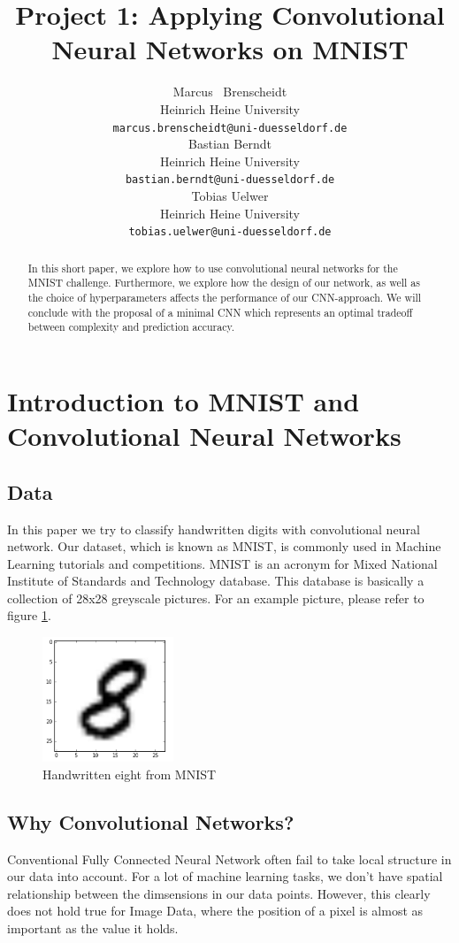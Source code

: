 \documentclass{article}
\title{Project 1: Applying Convolutional Neural Networks on MNIST}
\author{
  Marcus ~Brenscheidt \\
  Heinrich Heine University\\
  \texttt{marcus.brenscheidt@uni-duesseldorf.de} \\
  \And
  Bastian Berndt \\
  Heinrich Heine University\\
  \texttt{bastian.berndt@uni-duesseldorf.de} \\
  \And
  Tobias Uelwer \\
  Heinrich Heine University\\
  \texttt{tobias.uelwer@uni-duesseldorf.de} \\
}
\begin{document}

\maketitle

\begin{abstract}
  In this short paper, we explore how to use convolutional neural networks for the MNIST challenge. Furthermore, we explore how the design of our network, as well as the choice of hyperparameters affects the performance of our CNN-approach. We will conclude with the proposal of a minimal CNN which represents an optimal tradeoff between complexity and prediction accuracy.
\end{abstract}

\section{Introduction to MNIST and Convolutional Neural Networks}
\subsection{Data}
In this paper we try to classify handwritten digits with convolutional neural network. Our dataset, which is known as MNIST, is commonly used in Machine Learning tutorials and competitions. MNIST is an acronym for Mixed National Institute of Standards and Technology database. This database is basically a collection of 28x28 greyscale pictures. For an example picture, please refer to figure \ref{acht}.

\begin{figure}[h]
\centering
\includegraphics[width=0.35\textwidth]{imgs/8.png}
\caption{Handwritten eight from MNIST}\label{acht}
\end{figure}

\subsection{Why Convolutional Networks?}
Conventional Fully Connected Neural Network often fail to take local structure in our data into account. For a lot of machine learning tasks, we don't have spatial relationship between the dimsensions in our data points. However, this clearly does not hold true for Image Data, where the position of a pixel is almost as important as the value it holds.
\end{document}
